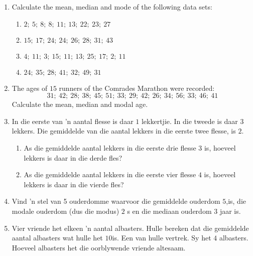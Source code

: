 \begin{exercises}{}{
    \begin{enumerate}[noitemsep, label=\textbf{\arabic*}.]
    \item Calculate the mean, median and mode of the following data sets:
      \begin{enumerate}[noitemsep, label=\textbf{(\alph*)} ]
      \item $2;~5;~8;~8;~11;~13;~22;~23;~27$
      \item $15;~17;~24;~24;~26;~28;~31;~43$
      \item $4;~11;~3;~15;~11;~13;~25;~17;~2;~11$
      \item $24;~35;~28;~41;~32;~49;~31$
      \end{enumerate}
    \item The ages of $15$ runners of the Comrades Marathon were recorded:
      \begin{equation*}
        31;~42;~28;~38;~45;~51;~33;~29;~42;~26;~34;~56;~33;~46;~41
      \end{equation*}
      Calculate the mean, median and modal age.
    \item In die eerste van ’n aantal flesse is daar $1$ lekkertjie. In die tweede is daar $3$ lekkers. Die gemiddelde van die aantal lekkers in die eerste twee flesse, is $2$.
      \begin{enumerate}[noitemsep, label=\textbf{(\alph*)} ]
      \item As die gemiddelde aantal lekkers in die eerste drie flesse $3$ is, hoeveel lekkers is daar in die derde fles?
      \item As die gemiddelde aantal lekkers in die eerste vier flesse $4$ is, hoeveel lekkers is daar in die vierde fles?
      \end{enumerate}
    \item Vind ’n stel van 5 ouderdomme waarvoor die gemiddelde ouderdom $5$,is, die modale ouderdom (dus die modus) $2$ s en die mediaan ouderdom $3$ jaar is.
    \item Vier vriende het elkeen ’n aantal albasters. Hulle bereken dat die gemiddelde aantal albasters wat hulle het $10$is. Een van hulle vertrek. Sy het $4$ albasters. Hoeveel albasters het die oorblywende vriende altesaam. 
    \end{enumerate}
}
\end{exercises}

